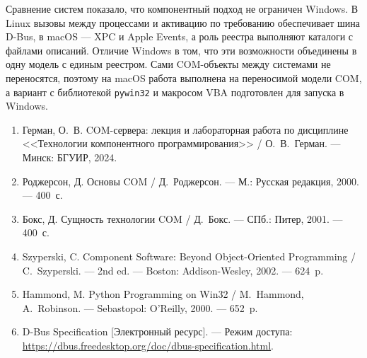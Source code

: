 \documentclass[14pt,a4paper]{extarticle}
\begin{document}
Сравнение систем показало, что компонентный подход не ограничен Windows. В Linux
вызовы между процессами и активацию по требованию обеспечивает шина D-Bus, в macOS ---
XPC и Apple Events, а роль реестра выполняют каталоги с файлами описаний. Отличие
Windows в том, что эти возможности объединены в одну модель с единым реестром. Сами
COM-объекты между системами не переносятся, поэтому на macOS работа выполнена на
переносимой модели COM, а вариант с библиотекой \texttt{pywin32} и макросом VBA
подготовлен для запуска в Windows.


\begin{enumerate}
\item Герман, О.~В. COM-сервера: лекция и лабораторная работа по дисциплине
<<Технологии компонентного программирования>> / О.~В.~Герман. --- Минск: БГУИР, 2024.
\item Роджерсон, Д. Основы COM / Д.~Роджерсон. --- М.: Русская редакция, 2000. ---
400~с.
\item Бокс, Д. Сущность технологии COM / Д.~Бокс. --- СПб.: Питер, 2001. --- 400~с.
\item Szyperski, C. Component Software: Beyond Object-Oriented Programming /
C.~Szyperski. --- 2nd ed. --- Boston: Addison-Wesley, 2002. --- 624~p.
\item Hammond, M. Python Programming on Win32 / M.~Hammond, A.~Robinson. ---
Sebastopol: O'Reilly, 2000. --- 652~p.
\item D-Bus Specification [Электронный ресурс]. --- Режим доступа:
\url{https://dbus.freedesktop.org/doc/dbus-specification.html}.
\end{enumerate}
\end{document}
